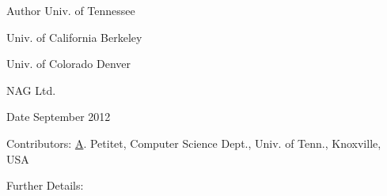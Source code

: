 \begin{DoxyAuthor}{Author}
Univ. of Tennessee 

Univ. of California Berkeley 

Univ. of Colorado Denver 

N\+A\+G Ltd. 
\end{DoxyAuthor}
\begin{DoxyDate}{Date}
September 2012 
\end{DoxyDate}
\begin{DoxyParagraph}{Contributors\+: }
\hyperlink{classA}{A}. Petitet, Computer Science Dept., Univ. of Tenn., Knoxville, U\+S\+A 
\end{DoxyParagraph}
\begin{DoxyParagraph}{Further Details\+: }
\begin{DoxyVerb} \end{DoxyVerb}
 
\end{DoxyParagraph}

